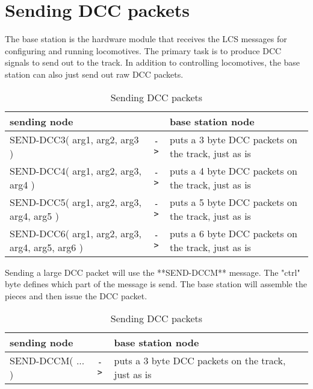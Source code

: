 \section{Sending DCC packets}

The base station is the hardware module that receives the LCS messages for configuring and running locomotives. The primary task is to produce DCC signals to send out to the track. In addition to controlling locomotives, the base station can also just send out raw DCC packets.

\begin{table}[ht!]
    \begin{center}
        \caption{Sending DCC packets}
        \begin{tabular}{|p{}| c |p{}|}
            \toprule
            \textbf{sending node} & & \textbf{ base station node} \\
            \midrule
            SEND-DCC3( arg1, arg2, arg3 ) & \texttt{->} & puts a 3 byte DCC packets on the track, just as is \\
            SEND-DCC4( arg1, arg2, arg3, arg4 ) & \texttt{->} & puts a 4 byte DCC packets on the track, just as is \\
            SEND-DCC5( arg1, arg2, arg3, arg4, arg5 ) & \texttt{->} & puts a 5 byte DCC packets on the track, just as is \\
            SEND-DCC6( arg1, arg2, arg3, arg4, arg5, arg6 ) & \texttt{->} & puts a 6 byte DCC packets on the track, just as is \\
            \bottomrule
        \end{tabular}
    \end{center}
\end{table}

Sending a large DCC packet will use the **SEND-DCCM** message. The "ctrl" byte defines which part of the message is send. The base station will assemble the pieces and then issue the DCC packet. 

\begin{table}[ht!]
    \begin{center}
        \caption{Sending DCC packets}
        \begin{tabular}{|p{}| c |p{}|}
            \toprule
            \textbf{sending node} & & \textbf{ base station node} \\
            \midrule
            SEND-DCCM( ... ) & \texttt{->} & puts a 3 byte DCC packets on the track, just as is \\
            \bottomrule
        \end{tabular}
    \end{center}
\end{table}

